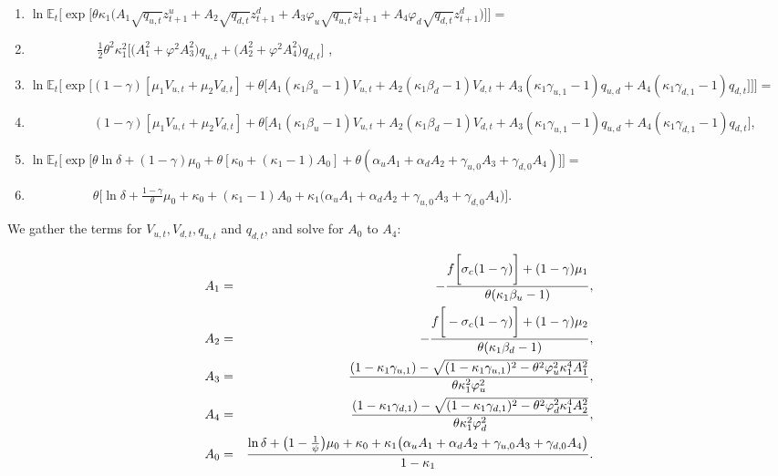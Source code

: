 \documentclass[11pt]{article}
\begin{document}
\begin{small}
\begin{enumerate}
\item $\ln\mathbb{E}_t\Bigg[\exp\bigg[\theta\kappa_1\big(A_1\sqrt{q_{u,t}}%
z^u_{t+1}+A_2\sqrt{q_{d,t}}z^d_{t+1}+A_3\varphi_u\sqrt{q_{u,t}}%
z^1_{t+1}+A_4\varphi_d\sqrt{q_{d,t}}z^d_{t+1}\big)\bigg]\Bigg]=$

\item ~~~~~~~~~~ $\frac{1}{2}\theta^2\kappa_1^2\bigg[\big(%
A_1^2+\varphi^2A^2_3\big)q_{u,t}+\big(A_2^2+\varphi^2A^2_4\big)q_{d,t}\bigg]$%
,

\item $\ln\mathbb{E}_t\Bigg[\exp\bigg[(1-\gamma)\left[\mu_1 V_{u,t}+\mu_2
V_{d,t}\right]+\theta\Big[A_1(\kappa_1\beta_u-1)V_{u,t}+A_2(\kappa_1%
\beta_d-1)V_{d,t}+A_3(\kappa_1\gamma_{u,1}-1)q_{u,d}+A_4(\kappa_1%
\gamma_{d,1}-1)q_{d,t}\Big]\bigg]\Bigg]=$

\item ~~~~~~~~~~$(1-\gamma)\left[\mu_1 V_{u,t}+\mu_2 V_{d,t}\right]+\theta%
\Big[A_1(\kappa_1\beta_u-1)V_{u,t}+A_2(\kappa_1\beta_d-1)V_{d,t}+A_3(%
\kappa_1\gamma_{u,1}-1)q_{u,d}+A_4(\kappa_1\gamma_{d,1}-1)q_{d,t}\Big]$,

\item $\ln\mathbb{E}_t\Bigg[\exp\bigg[\theta\ln\delta+(1-\gamma)\mu_0+\theta[%
\kappa_0+(\kappa_1-1)A_0]+\theta(\alpha_uA_1+\alpha_dA_2+\gamma_{u,0}A_3+%
\gamma_{d,0}A_4)\bigg]\Bigg]=$

\item ~~~~~~~~~~$\theta\Big[\ln\delta + \frac{1-\gamma}{\theta}%
\mu_0+\kappa_0+(\kappa_1-1)A_0+\kappa_1\big(\alpha_uA_1+\alpha_d
A_2+\gamma_{u,0}A_3+\gamma_{d,0}A_4\big)\Big]$.
\end{enumerate}

We gather the terms for $V_{u,t}, V_{d,t}, q_{u,t}$ and $q_{d,t}$, and solve
for $A_0$ to $A_4$:

\begin{eqnarray}
A_{1} &=&-\frac{f\bigg[\sigma _{c}(1-\gamma )\bigg]+(1-\gamma )\mu _{1}}{%
\theta (\kappa _{1}\beta _{u}-1)}, \\
A_{2} &=&-\frac{f\bigg[-\sigma _{c}(1-\gamma )\bigg]+(1-\gamma )\mu _{2}}{%
\theta (\kappa _{1}\beta _{d}-1)}, \\
A_{3} &=&\frac{(1-\kappa _{1}\gamma _{u,1})-\sqrt{(1-\kappa _{1}\gamma
_{u,1})^{2}-\theta ^{2}\varphi _{u}^{2}\kappa _{1}^{4}A_{1}^{2}}}{\theta
\kappa _{1}^{2}\varphi _{u}^{2}}, \\
A_{4} &=&\frac{(1-\kappa _{1}\gamma _{d,1})-\sqrt{(1-\kappa _{1}\gamma
_{d,1})^{2}-\theta ^{2}\varphi _{d}^{2}\kappa _{1}^{4}A_{2}^{2}}}{\theta
\kappa _{1}^{2}\varphi _{d}^{2}}, \\
A_{0} &=&\frac{\ln \delta +\big(1-\frac{1}{\psi }\big)\mu _{0}+\kappa
_{0}+\kappa _{1}\big(\alpha _{u}A_{1}+\alpha _{d}A_{2}+\gamma
_{u,0}A_{3}+\gamma _{d,0}A_{4}\big)}{1-\kappa _{1}}.
\end{eqnarray}


\end{small}
\end{document}
